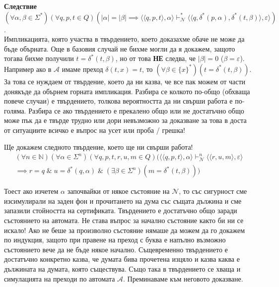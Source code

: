 \documentclass[12pt]{article}
\begin{document}
\textbf{Следствие}
\((\forall \alpha, \beta \in \Sigma^*)(\forall q, p, t \in Q)(|\alpha| = |\beta| \implies \langle \langle q, p, t \rangle, \alpha \rangle \vdash_{\mathcal N}^*  \langle \langle q, \delta^*(p, \alpha), \delta^*(t, \beta) \rangle, \varepsilon \rangle )\). \\

Импликацията, която участва в твърдението, което доказахме обаче не може да бъде обърната. Още в базовия случай не бихме могли да я докажем, защото тогава бихме получили \(t = \delta^*(t, \beta)\), но от това \textbf{НЕ} следва, че \(|\beta| = 0\) (\(\beta = \varepsilon\)). Например ако в \(\mathcal A\) имаме преход \(\delta(t, x) = t\), то \((\forall \beta \in \{x\}^*)(t = \delta^*(t, \beta))\). \\

За това се нуждаем от твърдение, което да ни казва, че все пак можем от части донякъде да обърнем горната импликация. Разбира се колкото по-общо (обхваща повече случаи) е твърдението, толкова вероятността да ни свърши работа е по-голяма. Разбира се ако твърдението е прекалено общо или не достатъчно общо може пък да е твърде трудно или дори невъзможно за доказване за това в доста от ситуациите всичко е въпрос на усет или проба / грешка! 

Ще докажем следното твърдение, което ще ни свърши работа! \\

\begin{align*}
    (\forall n \in \mathbb N)(\forall \alpha \in \Sigma^n)(\forall q, p, t, r, u, m \in Q)(
    \langle \langle q, p, t \rangle, \alpha \rangle \vdash_{\mathcal N}^n  \langle \langle r, u, m \rangle, \varepsilon \rangle \\ \implies r = q \;\&\; u = \delta^*(q, \alpha) \;\&\; (\exists \beta \in \Sigma^n)(m = \delta^*(t, \beta))
    )
\end{align*}

Тоест ако изчетем \(\alpha\) започвайки от някое състояние на \(\mathcal N\), то със сигурност сме изсимулирали на заден фон и прочитането на дума със същата дължина и сме запазили стойността на сертификата. Твърдението е достатъчно общо заради състоянието на автомата. Не става въпрос за начално състояние както би ни се искало! Ако не беше за произволно състояние нямаше да можем да го докажем по индукция, защото при правене на преход с буква е напълно възможно състоянието вече да не бъде някое начално. Същевременно твърдението е достатъчно конкретно казва, че думата бива прочетена изцяло и казва каква е дължината на думата, която съществува. Също така в твърдението се хваща и симулацията на преходи по автомата \(\mathcal A\). Преминаваме към неговото доказване. \\
\end{document}
